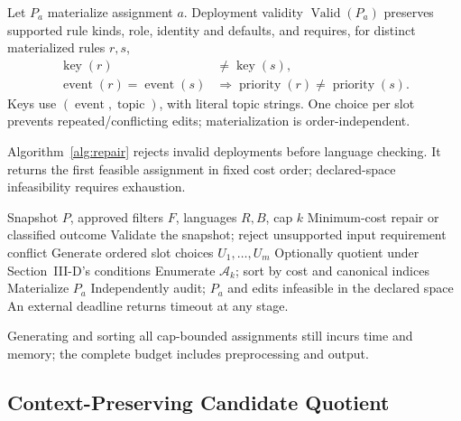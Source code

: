 \documentclass[letterpaper,journal]{IEEEtran}
\begin{document}
Let $P_a$ materialize assignment $a$. Deployment validity $\operatorname{Valid}(P_a)$ preserves supported rule kinds, role, identity and defaults, and requires, for distinct materialized rules $r,s$,
\begin{equation}\label{eq:deployment}\begin{aligned}
 \operatorname{key}(r)&\ne\operatorname{key}(s),\\
 \operatorname{event}(r)=\operatorname{event}(s)
 &\Rightarrow\operatorname{priority}(r)\ne\operatorname{priority}(s).
\end{aligned}\end{equation}
Keys use $(\operatorname{event},\operatorname{topic})$, with literal topic strings. One choice per slot prevents repeated/conflicting edits; materialization is order-independent.

Algorithm~\ref{alg:repair} rejects invalid deployments before language checking. It returns the first feasible assignment in fixed cost order; declared-space infeasibility requires exhaustion.

\begin{algorithm}[!t]
\caption{Bounded deployment-valid combination repair}\label{alg:repair}
\begin{algorithmic}[1]
\Require Snapshot $P$, approved filters $F$, languages $R,B$, cap $k$
\Ensure Minimum-cost repair or classified outcome
\State Validate the snapshot; reject unsupported input
 \State \Return requirement conflict
\EndIf
\State Generate ordered slot choices $U_1,\ldots,U_m$
\State Optionally quotient under Section~III-D's conditions
\State Enumerate $\mathcal A_k$; sort by cost and canonical indices
 \State Materialize $P_a$
   \State Independently audit; \Return $P_a$ and edits
  \EndIf
 \EndIf
\EndFor
\State \Return infeasible in the declared space
\Statex An external deadline returns timeout at any stage.
\end{algorithmic}
\end{algorithm}

Generating and sorting all cap-bounded assignments still incurs time and memory; the complete budget includes preprocessing and output.

\subsection{Context-Preserving Candidate Quotient}
\end{document}
